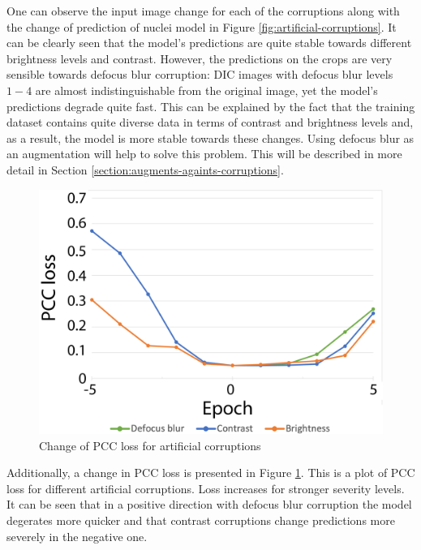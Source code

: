 One can observe the input image change for each of the corruptions along with the change of prediction of nuclei model in Figure \ref{fig:artificial-corruptions}. It can be clearly seen that the model's predictions are quite stable towards different brightness levels and contrast. However, the predictions on the crops are very sensible towards defocus blur corruption: DIC images with defocus blur levels $1-4$ are almost indistinguishable from the original image, yet the model's predictions degrade quite fast. This can be explained by the fact that the training dataset contains quite diverse data in terms of contrast and brightness levels and, as a result, the model is more stable towards these changes. Using defocus blur as an augmentation will help to solve this problem. This will be described in more detail in Section \ref{section:augments-againts-corruptions}.
\begin{figure}[htb]
	\begin{center}
		\includegraphics[width=0.5\linewidth]{bilder/corruptions-loss.png}
		\caption{Change of PCC loss for artificial corruptions}\label{fig:corruptions-loss}
	\end{center}
\end{figure}

Additionally, a change in PCC loss is presented in Figure \ref{fig:corruptions-loss}. This is a plot of PCC loss for different artificial corruptions. Loss increases for stronger severity levels. It can be seen that in a positive direction with defocus blur corruption the model degerates more quicker and that contrast corruptions change predictions more severely in the negative one.